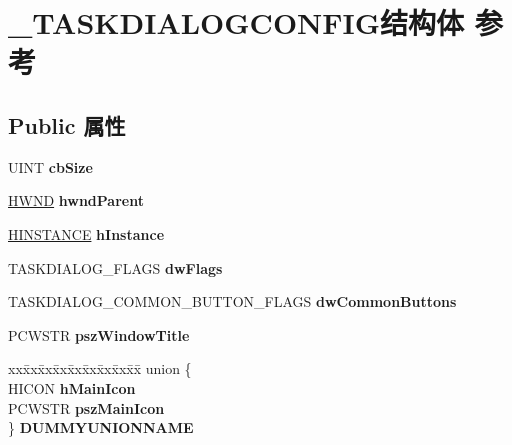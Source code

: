 \hypertarget{struct___t_a_s_k_d_i_a_l_o_g_c_o_n_f_i_g}{}\section{\+\_\+\+T\+A\+S\+K\+D\+I\+A\+L\+O\+G\+C\+O\+N\+F\+I\+G结构体 参考}
\label{struct___t_a_s_k_d_i_a_l_o_g_c_o_n_f_i_g}
\subsection*{Public 属性}
\begin{DoxyCompactItemize}
\item 
\mbox{\label{struct___t_a_s_k_d_i_a_l_o_g_c_o_n_f_i_g_a9594fcee252fe9d31e8112ce0e21330b}} 
U\+I\+NT {\bfseries cb\+Size}
\item 
\mbox{\label{struct___t_a_s_k_d_i_a_l_o_g_c_o_n_f_i_g_aa976a1ec020c22265b1ea5128a7e7392}} 
\hyperlink{interfacevoid}{H\+W\+ND} {\bfseries hwnd\+Parent}
\item 
\mbox{\label{struct___t_a_s_k_d_i_a_l_o_g_c_o_n_f_i_g_ad37df7434499fedeb1d7bf3adacd901e}} 
\hyperlink{interfacevoid}{H\+I\+N\+S\+T\+A\+N\+CE} {\bfseries h\+Instance}
\item 
\mbox{\label{struct___t_a_s_k_d_i_a_l_o_g_c_o_n_f_i_g_af54351820304093d38cde32d08a9153e}} 
T\+A\+S\+K\+D\+I\+A\+L\+O\+G\+\_\+\+F\+L\+A\+GS {\bfseries dw\+Flags}
\item 
\mbox{\label{struct___t_a_s_k_d_i_a_l_o_g_c_o_n_f_i_g_a163d26e952bd14f0cbe95b65489d6cb3}} 
T\+A\+S\+K\+D\+I\+A\+L\+O\+G\+\_\+\+C\+O\+M\+M\+O\+N\+\_\+\+B\+U\+T\+T\+O\+N\+\_\+\+F\+L\+A\+GS {\bfseries dw\+Common\+Buttons}
\item 
\mbox{\label{struct___t_a_s_k_d_i_a_l_o_g_c_o_n_f_i_g_a98d8101f1846f2345a484edef3d365c5}} 
P\+C\+W\+S\+TR {\bfseries psz\+Window\+Title}
\item 
\mbox{\label{struct___t_a_s_k_d_i_a_l_o_g_c_o_n_f_i_g_ab6909e532c8de6ace69d5668434b7bbf}} 
\begin{tabbing}
xx\=xx\=xx\=xx\=xx\=xx\=xx\=xx\=xx\=\kill
union \{\\
\>HICON {\bfseries hMainIcon}\\
\>PCWSTR {\bfseries pszMainIcon}\\
\} {\bfseries DUMMYUNIONNAME}\\


\end{tabbing}
\end{DoxyCompactItemize}
